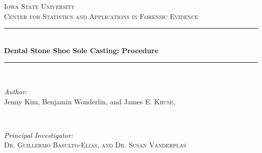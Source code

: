\graphicspath{ {images/} }

\usepackage{hyperref}



\begin{titlepage}

\newcommand{\HRule}{\rule{\linewidth}{0.5mm}} %

\center %
 
\textsc{\LARGE Iowa State University}\\[1.5cm] %
\textsc{\large Center for Statistics and Applications in Forensic Evidence }\\[0.5cm] %


\HRule \\[0.4cm]
{ \huge \bfseries Dental Stone Shoe Sole Casting: Procedure}\\[0.4cm] %
\HRule \\[1.5cm]
 
\begin{minipage}{0.4\textwidth}
\begin{flushleft} \large
\emph{Author:}\\
Jenny Kim, \newline Benjamin Wonderlin, and James \textsc{E. Kruse, } %
\end{flushleft}
\end{minipage}
~
\begin{minipage}{0.4\textwidth}
\begin{flushright} \large
\emph{Principal Investigator:} \\
 \textsc{Dr. Guillermo Basulto-Elias, and Dr. Susan Vanderplas } %
\end{flushright}
\end{minipage}\\[2cm]


\end{titlepage}
